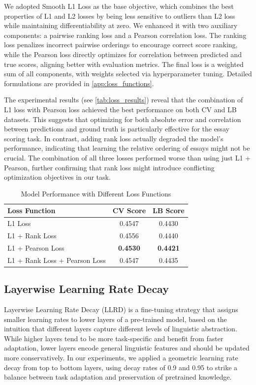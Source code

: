 \documentclass[12pt]{article}
\begin{document}
We adopted Smooth L1 Loss as the base objective, which combines the best properties of L1 and L2 losses by being less sensitive to outliers than L2 loss while maintaining differentiability at zero. We enhanced it with two auxiliary components: a pairwise ranking loss and a Pearson correlation loss. The ranking loss penalizes incorrect pairwise orderings to encourage correct score ranking, while the Pearson loss directly optimizes for correlation between predicted and true scores, aligning better with evaluation metrics. The final loss is a weighted sum of all components, with weights selected via hyperparameter tuning. Detailed formulations are provided in \autoref{app:loss_functions}. 

The experimental results (see \autoref{tab:loss_results}) reveal that the combination of L1 loss with Pearson loss achieved the best performance on both CV and LB datasets. This suggests that optimizing for both absolute error and correlation between predictions and ground truth is particularly effective for the essay scoring task. In contrast, adding rank loss actually degraded the model's performance, indicating that learning the relative ordering of essays might not be crucial. The combination of all three losses performed worse than using just L1 + Pearson, further confirming that rank loss might introduce conflicting optimization objectives in our task.

\begin{table}[H]
\centering
\caption{Model Performance with Different Loss Functions}
\label{tab:loss_results}
\begin{tabular}{lcc}
\hline
\textbf{Loss Function} & \textbf{CV Score} & \textbf{LB Score} \\
\hline
L1 Loss & 0.4547 & 0.4430 \\
L1 + Rank Loss & 0.4556 & 0.4440 \\
L1 + Pearson Loss & \textbf{0.4530} & \textbf{0.4421} \\
L1 + Rank Loss + Pearson Loss & 0.4547 & 0.4435 \\
\hline
\end{tabular}
\end{table}

\subsection{Layerwise Learning Rate Decay}
Layerwise Learning Rate Decay (LLRD) \cite{llrd} is a fine-tuning strategy that assigns smaller learning rates to lower layers of a pre-trained model, based on the intuition that different layers capture different levels of linguistic abstraction. While higher layers tend to be more task-specific and benefit from faster adaptation, lower layers encode general linguistic features and should be updated more conservatively. In our experiments, we applied a geometric learning rate decay from top to bottom layers, using decay rates of 0.9 and 0.95 to strike a balance between task adaptation and preservation of pretrained knowledge.
\end{document}
